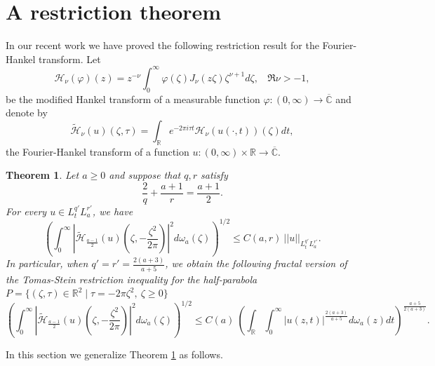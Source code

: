 \documentclass[11pt,letter]{amsart}
\def \R {\mathbb{R}}
\def \vf{\varphi}
\numberwithin{equation}{section}
\newcommand{\C}{\mathbb{C}}
\newtheorem{theorem}{Theorem}[section]
\numberwithin{equation}{section}
\begin{document}
\section{A restriction theorem}\label{S:res}

In our recent work \cite{GS} we have proved 
the following restriction result for the Fourier-Hankel transform. Let 
\[
\mathcal H_\nu(\vf)(z) = z^{-\nu}\int_0^\infty \vf(\zeta) J_\nu(z\zeta) \zeta^{\nu+1} d\zeta,\ \ \ \ \Re \nu>-1,
\]
be the modified Hankel transform of a measurable function $\vf:(0,\infty)\to \overline{\C}$
and denote by 
\begin{equation}\label{FH}
\widetilde{\mathcal H}_\nu(u)(\zeta,\tau) = \int_{\R} e^{-2\pi i \tau t} \mathcal H_\nu(u(\cdot,t))(\zeta) dt,
\end{equation}
the Fourier-Hankel transform of a function $u:(0,\infty)\times \R \to \overline{\C}$.

\begin{theorem}\label{T:restriction}
Let $a\ge 0$ and suppose that $q, r$ satisfy 
\[
\frac 2q + \frac{a+1}r = \frac{a+1}2.
\]
For every $u\in L^{q'}_t L^{r'}_a$, we have 
\begin{equation}\label{re1}
\left(\int_0^\infty |\widetilde{\mathcal{H}}_{\frac{a-1}2}(u)(\zeta,-\frac{\zeta^2}{2\pi})|^2 d\omega_a(\zeta) \right)^{1/2}  \le C(a,r)\ ||u||_{L^{q'}_t L^{r'}_a}.
\end{equation}
In particular, when $q'=r' = \frac{2(a+3)}{a+5}$, we obtain the following fractal version of the \emph{Tomas-Stein restriction inequality} for the half-parabola
$P = \{(\zeta,\tau)\in \R^2\mid \tau = - 2\pi \zeta^2,\ \zeta\ge 0\}$
\begin{equation}\label{re2}
\left(\int_0^\infty |\widetilde{\mathcal{H}}_{\frac{a-1}2}(u)(\zeta,-\frac{\zeta^2}{2\pi})|^2 d\omega_a(\zeta) \right)^{1/2}  \le C(a)\ \left(\int_{\R} \int_0^\infty |u(z,t)|^{\frac{2(a+3)}{a+5}} d\omega_a(z) dt\right)^{\frac{a+5}{2(a+3)}}.
\end{equation}
\end{theorem}

In this section we generalize Theorem \ref{T:restriction} as follows.
\end{document}
